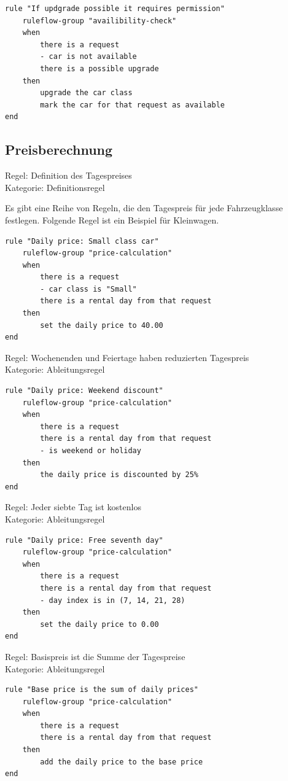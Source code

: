 \begin{lstlisting}
rule "If updgrade possible it requires permission"
	ruleflow-group "availibility-check"
	when
		there is a request
		- car is not available
		there is a possible upgrade
	then
		upgrade the car class
		mark the car for that request as available
end
\end{lstlisting}

\subsection{Preisberechnung}

Regel: Definition des Tagespreises \\
Kategorie: Definitionsregel

Es gibt eine Reihe von Regeln, die den Tagespreis für jede Fahrzeugklasse festlegen.
Folgende Regel ist ein Beispiel für Kleinwagen.

\begin{lstlisting}
rule "Daily price: Small class car" 
	ruleflow-group "price-calculation"
	when
		there is a request
		- car class is "Small"
		there is a rental day from that request
	then
		set the daily price to 40.00
end
\end{lstlisting}

Regel: Wochenenden und Feiertage haben reduzierten Tagespreis \\
Kategorie: Ableitungsregel

\begin{lstlisting}
rule "Daily price: Weekend discount"
	ruleflow-group "price-calculation"
	when
		there is a request
		there is a rental day from that request
		- is weekend or holiday
	then
		the daily price is discounted by 25%
end
\end{lstlisting}

\newpage
Regel: Jeder siebte Tag ist kostenlos \\
Kategorie: Ableitungsregel

\begin{lstlisting}
rule "Daily price: Free seventh day"
	ruleflow-group "price-calculation"
	when
		there is a request
		there is a rental day from that request
		- day index is in (7, 14, 21, 28)
	then
		set the daily price to 0.00
end
\end{lstlisting}

Regel: Basispreis ist die Summe der Tagespreise \\
Kategorie: Ableitungsregel

\begin{lstlisting}
rule "Base price is the sum of daily prices"
	ruleflow-group "price-calculation"
	when
		there is a request
		there is a rental day from that request
	then
		add the daily price to the base price
end
\end{lstlisting}

